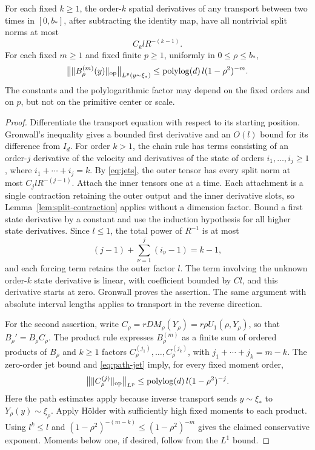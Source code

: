 \begin{lemma}\label{lem:transport-derivatives}
For each fixed $k\ge1$, the order-$k$ spatial derivatives of any transport
between two times in $[0,b_*]$, after subtracting the identity map, have
all nontrivial split norms at most
\[
 C_k lR^{-(k-1)}.
\]
For each fixed $m\ge1$ and fixed finite $p\ge1$, uniformly in
$0\le\rho\le b_*$,
\[
 \big\|\|B_\rho^{(m)}(y)\|_{\mathrm{op}}\big\|_{L^p(y\sim\xi_*)}
 \le \operatorname{polylog}(d)\,l(1-\rho^2)^{-m}.
\]
The constants and the polylogarithmic factor may depend on the fixed
orders and on $p$, but not on the primitive center or scale.
\end{lemma}

\begin{proof}
Differentiate the transport equation with respect to its starting
position.  Gronwall's inequality gives a bounded first derivative and an
$O(l)$ bound for its difference from $I_d$.  For order $k>1$, the chain
rule has terms consisting of an order-$j$ derivative of the velocity
and derivatives of the state of orders $i_1,\ldots,i_j\ge1$, where
$i_1+\cdots+i_j=k$.  By \eqref{eq:jets}, the outer tensor has every
split norm at most $C_j lR^{-(j-1)}$.  Attach the inner tensors one at
a time.  Each attachment is a single contraction retaining the outer
output and the inner derivative slots, so
Lemma~\ref{lem:split-contraction} applies without a dimension factor.
Bound a first state derivative by a constant and use the induction
hypothesis for all higher state derivatives.  Since $l\le1$, the total
power of $R^{-1}$ is at most
\[
 (j-1)+\sum_{\nu=1}^j(i_\nu-1)=k-1,
\]
and each forcing term retains the outer factor $l$.  The term involving
the unknown order-$k$ state derivative is linear, with coefficient
bounded by $Cl$, and this derivative starts at zero.  Gronwall proves
the assertion.  The same argument with absolute interval lengths
applies to transport in the reverse direction.

For the second assertion, write
$C_\rho=rDM_\rho(Y_\rho)=r\rho U_1(\rho,Y_\rho)$, so that
$B_\rho'=B_\rho C_\rho$.  The product rule expresses $B_\rho^{(m)}$
as a finite sum of ordered products of $B_\rho$ and $k\ge1$ factors
$C_\rho^{(j_1)},\ldots,C_\rho^{(j_k)}$, with
$j_1+\cdots+j_k=m-k$.  The zero-order jet bound and
\eqref{eq:path-jet} imply, for every fixed moment order,
\[
 \big\|\|C_\rho^{(j)}\|_{\mathrm{op}}\big\|_{L^p}
 \le \operatorname{polylog}(d)\,l(1-\rho^2)^{-j}.
\]
Here the path estimates apply because inverse transport sends
$y\sim\xi_*$ to $Y_\rho(y)\sim\xi_\rho$.  Apply H\"older with
sufficiently high fixed moments to each product.  Using $l^k\le l$
and $(1-\rho^2)^{-(m-k)}\le(1-\rho^2)^{-m}$ gives the claimed
conservative exponent.  Moments below one, if desired, follow from
the $L^1$ bound.
\end{proof}

